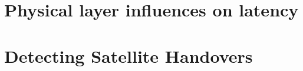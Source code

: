 \documentclass[IN,11pt,twoside,openright,idp,english]{tumthesis}
\begin{document}








\section{Physical layer influences on latency}




\section{Detecting Satellite Handovers}
\end{document}
